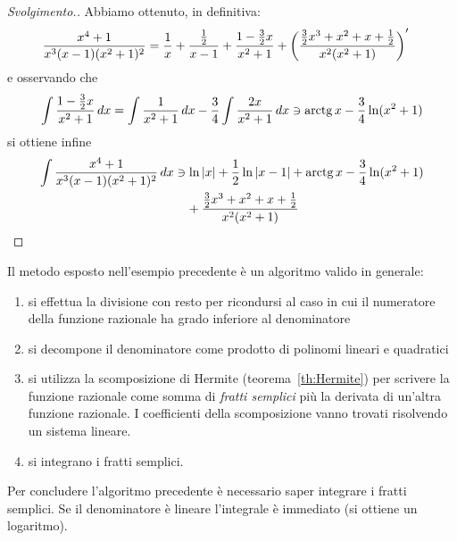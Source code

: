 \begin{proof}[Svolgimento.]
Abbiamo ottenuto, in definitiva:
\begin{align*}
\frac{x^4+1}{x^3(x-1)(x^2+1)^2}
&= \frac{1}{x} + \frac{\frac 1 2}{x-1} + \frac{1 - \frac 3 2 x}{x^2+1}
+ {\left( \frac{\frac 3 2 x^3 + x^2 + x + \frac 1 2}{x^2(x^2+1)} \right)}'
\end{align*}
e osservando che
\[
 \int \frac{1 - \frac 3 2 x}{x^2+1}\, dx
 = \int \frac{1}{x^2+1}\, dx - \frac 3 4 \int \frac{2x}{x^2+1}\, dx
 \ni \operatorname{arctg} x - \frac 3 4 \ln(x^2+1)
\]
si ottiene infine
\begin{align*}
\int \frac{x^4+1}{x^3(x-1)(x^2+1)^2}\, dx
 &\ni \ln {\left|x\right|} + \frac 1 2 \ln{\left|x-1\right|} + \operatorname{arctg} x - \frac 3 4 \ln(x^2+1) \\
 &\quad + \frac{\frac 3 2 x^3 + x^2+x+\frac 1 2}{x^2(x^2+1)}
\end{align*}
\end{proof}

Il metodo esposto nell'esempio precedente è un algoritmo 
valido in generale:
%
%
%
%
%
\begin{enumerate}
  \item si effettua la divisione con resto per ricondursi
  al caso in cui il numeratore della funzione razionale
  ha grado inferiore al denominatore
  \item si decompone il denominatore come prodotto di
  polinomi lineari e quadratici
  \item si utilizza la scomposizione di Hermite (teorema~\ref{th:Hermite})
  per scrivere la funzione razionale come somma di \emph{fratti semplici}
  più la derivata di un'altra funzione razionale. I coefficienti
  della scomposizione vanno trovati risolvendo un sistema lineare.
  \item si integrano i fratti semplici.
\end{enumerate}

Per concludere l'algoritmo precedente è necessario saper integrare i fratti semplici. Se il denominatore è lineare l'integrale è immediato (si ottiene un logaritmo).

